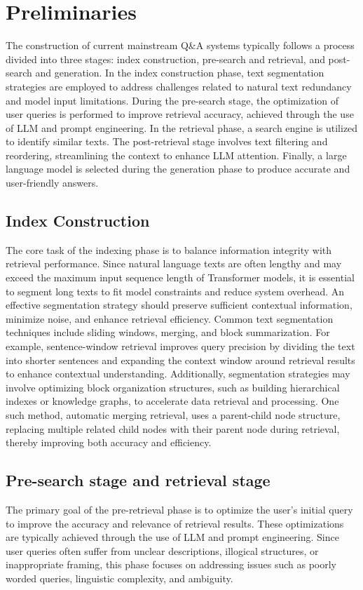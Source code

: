 \section{Preliminaries}
The construction of current mainstream Q\&A systems typically follows a process divided into three stages: index construction, pre-search and retrieval, and post-search and generation. In the index construction phase, text segmentation strategies are employed to address challenges related to natural text redundancy and model input limitations. During the pre-search stage, the optimization of user queries is performed to improve retrieval accuracy, achieved through the use of LLM and prompt engineering. In the retrieval phase, a search engine is utilized to identify similar texts. The post-retrieval stage involves text filtering and reordering, streamlining the context to enhance LLM attention. Finally, a large language model is selected during the generation phase to produce accurate and user-friendly answers.




\subsection{Index Construction}
The core task of the indexing phase is to balance information integrity with retrieval performance. Since natural language texts are often lengthy and may exceed the maximum input sequence length of Transformer models, it is essential to segment long texts to fit model constraints and reduce system overhead. An effective segmentation strategy should preserve sufficient contextual information, minimize noise, and enhance retrieval efficiency. Common text segmentation techniques include sliding windows, merging, and block summarization. For example, sentence-window retrieval improves query precision by dividing the text into shorter sentences and expanding the context window around retrieval results to enhance contextual understanding. Additionally, segmentation strategies may involve optimizing block organization structures, such as building hierarchical indexes or knowledge graphs, to accelerate data retrieval and processing. One such method, automatic merging retrieval, uses a parent-child node structure, replacing multiple related child nodes with their parent node during retrieval, thereby improving both accuracy and efficiency.



\subsection{Pre-search stage and retrieval stage}\label{tt_intro}
The primary goal of the pre-retrieval phase is to optimize the user's initial query to improve the accuracy and relevance of retrieval results. These optimizations are typically achieved through the use of LLM and prompt engineering. Since user queries often suffer from unclear descriptions, illogical structures, or inappropriate framing, this phase focuses on addressing issues such as poorly worded queries, linguistic complexity, and ambiguity.


